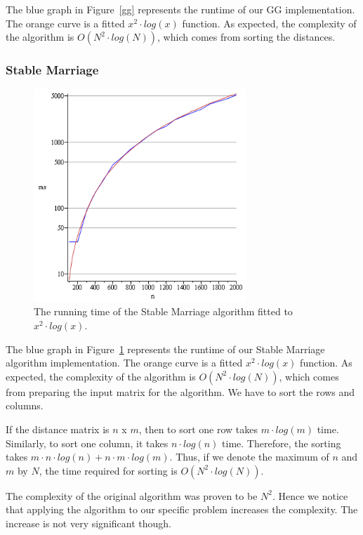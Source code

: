 \documentclass[a4paper,11pt]{article}
\begin{document}
The blue graph in Figure~\ref{gg} represents the runtime of our GG implementation. The orange curve is a fitted $x^2 \cdot log(x)$ function. As expected, the complexity of the algorithm is $O(N^{2} \cdot log(N))$, which comes from sorting the distances.

\subsubsection{Stable Marriage}

\begin{figure}[ht!]
\centering 
\includegraphics[width=80mm]{SM_runtime.png}
\caption{The running time of the Stable Marriage algorithm fitted to $x^2 \cdot log(x)$.}
\label{sm} 
\end{figure}

The blue graph in Figure~\ref{sm} represents the runtime of our Stable Marriage algorithm implementation. The orange curve is a fitted $x^2 \cdot log(x)$ function. As expected, the complexity of the algorithm is $O(N^{2} \cdot log(N))$, which comes from preparing the input matrix for the algorithm. We have to sort the rows and columns.

  If the distance matrix is $n$ x $m$, then to sort one row takes $m \cdot log(m)$ time. Similarly, to sort one column, it takes $n \cdot log(n)$ time. Therefore, the sorting takes $m \cdot n \cdot log(n) + n \cdot m \cdot log(m)$. Thus, if we denote the maximum of $n$ and $m$ by $N$, the time required for sorting is $O(N^{2} \cdot log(N))$. 

The complexity of the original algorithm was proven to be $N^{2}$. Hence we notice that applying the algorithm to our specific problem increases the complexity. The increase is not very significant though.
\end{document}
